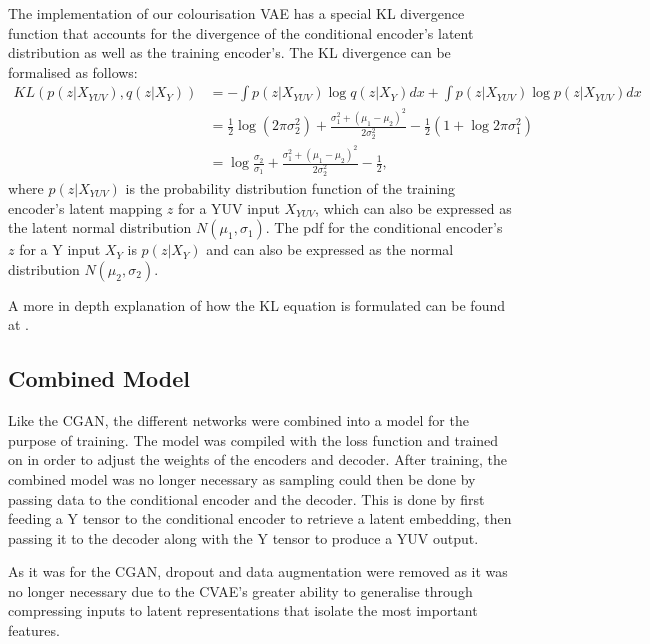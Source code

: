 \documentclass{l4proj}
\begin{document}
The implementation of our colourisation VAE has a special KL divergence function that accounts for the divergence of the conditional encoder's latent distribution as well as the training encoder's. The KL divergence can be formalised as follows:
\begin{equation}
\begin{split}
    KL(p(z|X_{YUV}),q(z|X_{Y})) & = - \int p(z|X_{YUV}) \log q(z|X_{Y}) dx + \int p(z|X_{YUV}) \log p(z|X_{YUV}) dx \\
            & = \frac{1}{2} \log (2 \pi \sigma_{2}^{2}) + \frac{\sigma_{1}^{2}+(\mu_{1}-\mu_{2})^2}{2\sigma_{2}^{2}}-\frac{1}{2}(1+\log{2\pi\sigma_{1}^{2}}) \\
            & = \log\frac{\sigma_{2}}{\sigma_{1}}+\frac{\sigma_{1}^{2}+(\mu_{1}-\mu_{2})^{2}}{2\sigma_{2}^{2}}-\frac{1}{2},
\end{split}
\end{equation}
where $p(z|X_{YUV})$ is the probability distribution function of the training encoder's latent mapping $z$ for a YUV input $X_{YUV}$, which can also be expressed as the latent normal distribution $N(\mu_{1},\sigma_{1})$. The pdf for the conditional encoder's $z$ for a Y input $X_{Y}$ is $p(z|X_{Y})$ and can also be expressed as the normal distribution $N(\mu_{2},\sigma_{2})$.

A more in depth explanation of how the KL equation is formulated can be found at \cite{KL}.

\subsection{Combined Model}
Like the CGAN, the different networks were combined into a model for the purpose of training. The model was compiled with the loss function and trained on in order to adjust the weights of the encoders and decoder. After training, the combined model was no longer necessary as sampling could then be done by passing data to the conditional encoder and the decoder. This is done by first feeding a Y tensor to the conditional encoder to retrieve a latent embedding, then passing it to the decoder along with the Y tensor to produce a YUV output.

As it was for the CGAN, dropout and data augmentation were removed as it was no longer necessary due to the CVAE's greater ability to generalise through compressing inputs to latent representations that isolate the most important features.
\end{document}
